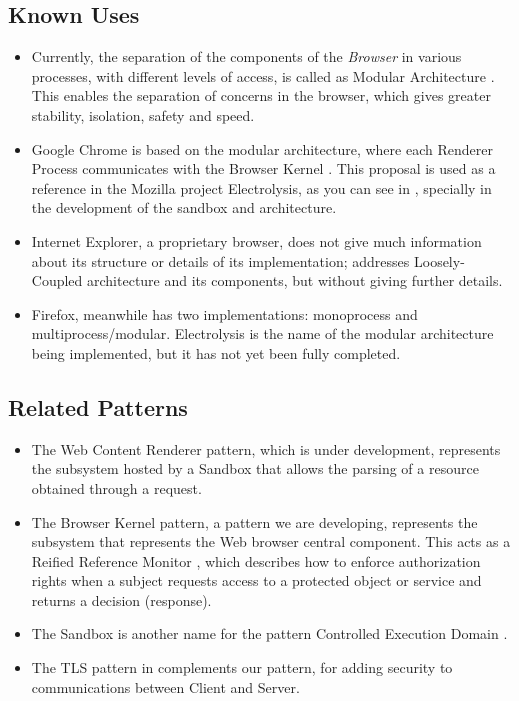 \documentclass{sig-alternate-05-2015}
\begin{document}
  \subsection*{Known Uses}
  \begin{itemize}
    \item Currently, the separation of the components of the \textit{Browser} in various processes, with different levels of access, is called as Modular Architecture \cite{Vrbanec2013}. This enables the separation of concerns in the browser, which gives greater stability, isolation, safety and speed.
    \item Google Chrome is based on the modular architecture, where each Renderer Process communicates with the Browser Kernel \cite{multiProcGC}. This proposal is used as a reference in the Mozilla project Electrolysis, as you can see in \cite{FirefoxThreatModel,featuresE10S}, specially in the development of the sandbox and architecture.
    \item Internet Explorer, a proprietary browser, does not give much information about its structure or details of its implementation; \cite{Crowley2010} addresses Loosely-Coupled architecture \cite{IE8-LCIE} and its components, but without giving further details. 
    \item Firefox, meanwhile has two implementations: monoprocess and multiprocess/modular. Electrolysis is the name of the modular architecture being implemented, but it has not yet been fully completed.
  \end{itemize}

  \subsection*{Related Patterns}
  \begin{itemize}
    \item The Web Content Renderer pattern, which is under development, represents the subsystem hosted by a Sandbox that allows the parsing of a resource obtained through a request.
    \item The Browser Kernel pattern, a pattern we are developing, represents the subsystem that represents the Web browser central component. This acts as a Reified Reference Monitor \cite{fernandez2013security}, which describes how to enforce authorization rights when a subject requests access to a protected object or service and returns a decision (response). 
    \item The Sandbox is another name for the pattern Controlled Execution Domain \cite{fernandez2013security}.
    \item The TLS pattern in \cite{fernandez2013security} complements our pattern, for adding security to communications between Client and Server.
  \end{itemize}
\end{document}
